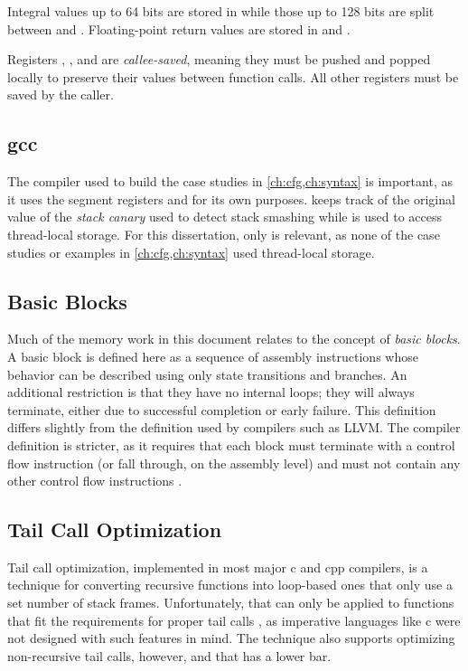 Integral values up to 64 bits are stored in  while those up to 128 bits
are split between  and .
Floating-point return values are stored in  and .

Registers , , and  are
\emph{callee-saved}, meaning they must be pushed and popped locally to preserve their
values between function calls. All other registers must be saved by the caller.

\subsection{\Ac{gcc}}
The compiler used to build the case studies in \cref{ch:cfg,ch:syntax} is important,
as it uses the segment registers  and  for its own purposes.
 keeps track of the original value of the \emph{stack canary}
used to detect stack smashing \autocite{cowan1998stackguard}
while  is used to access thread-local storage.
For this dissertation, only  is relevant, as none of the case studies
or examples in \cref{ch:cfg,ch:syntax} used thread-local storage.

\subsection{Basic Blocks}
Much of the memory work in this document relates to the concept of \emph{basic blocks}.%
A basic block is defined here as a sequence of assembly instructions
whose behavior can be described using only state transitions and branches.
An additional restriction is that they have no internal loops;
they will always terminate, either due to successful completion or early failure.
This definition differs slightly from the definition used by compilers such as LLVM.
The compiler definition is stricter, as it requires that
each block must terminate with a control flow instruction
(or fall through, on the assembly level)
and must not contain any other control flow instructions
\autocite{llvm:functions,llvm:terminators}.

\subsection{Tail Call Optimization}
Tail call%
optimization, implemented in most major \gls{c} and \gls{cpp} compilers, is a technique
for converting recursive functions into loop-based ones that only use
a set number of stack frames.
Unfortunately, that can only be applied to functions that fit the requirements
for proper tail calls \autocite{probst2001proper},
as imperative languages like \gls{c} were not designed with such features in mind.
The technique also supports optimizing non-recursive tail calls, however,
and that has a lower bar.

